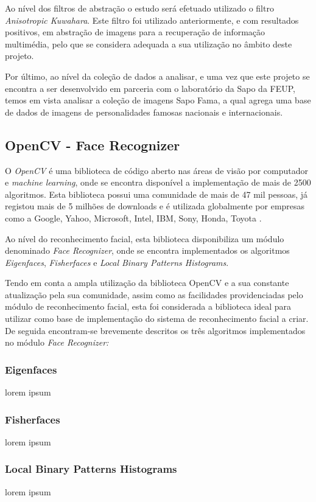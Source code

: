 Ao nível dos filtros de abstração o estudo será efetuado utilizado o filtro \textit{Anisotropic Kuwahara}.
Este filtro foi utilizado anteriormente, e com resultados positivos, em abstração de imagens para a recuperação de informação multimédia, pelo que se considera adequada a sua utilização no âmbito deste projeto.

Por último, ao nível da coleção de dados a analisar, e uma vez que este projeto se encontra a ser desenvolvido em parceria com o laboratório da Sapo da FEUP, temos em vista analisar a coleção de imagens Sapo Fama, a qual agrega uma base de dados de imagens de personalidades famosas nacionais e internacionais.
	
\subsection{OpenCV - Face Recognizer}
O \textit{OpenCV} é uma biblioteca de código aberto nas áreas de visão por computador e \textit{machine learning}, onde se encontra disponível a implementação de mais de 2500 algoritmos. Esta biblioteca possui uma comunidade de mais de 47 mil pessoas, já registou mais de 5 milhões de downloads e é utilizada globalmente por empresas como a Google, Yahoo, Microsoft, Intel, IBM, Sony, Honda, Toyota \cite{Team}. 

Ao nível do reconhecimento facial, esta biblioteca disponibiliza um módulo denominado \textit{Face Recognizer}, onde se encontra implementados os algoritmos \textit{Eigenfaces}, \textit{Fisherfaces} e \textit{Local Binary Patterns Histograms}.

Tendo em conta a ampla utilização da biblioteca OpenCV e a sua constante atualização pela sua comunidade, assim como as facilidades providenciadas pelo módulo de reconhecimento facial, esta foi considerada a biblioteca ideal para utilizar como base de implementação do sistema de reconhecimento facial a criar. De seguida encontram-se brevemente descritos os três algoritmos implementados no módulo \textit{Face Recognizer:}

\subsubsection{Eigenfaces}
lorem ipsum

\subsubsection{Fisherfaces}
lorem ipsum

\subsubsection{Local Binary Patterns Histograms}
lorem ipsum


